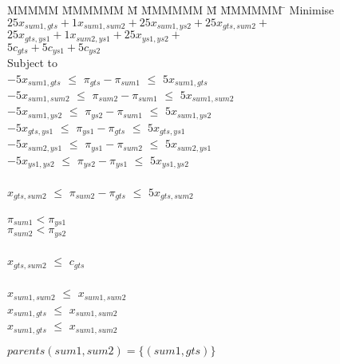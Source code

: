 \begin{tabbing}
MMMMM   \= MMMMMM \= M \= MMMMMM \= M \= MMMMMM \= \kill
Minimise   \> $25 x_{sum1, gts} + 1 x_{sum1,sum2} + 25 x_{sum1, ys2} + 25 x_{gts, sum2} +$ \\
           \> $25 x_{gts, ys1} + 1 x_{sum2, ys1} + 25 x_{ys1, ys2} + $ \\
           \> $ 5 c_{gts} + 5 c_{ys1} + 5 c_{ys2} $\\
Subject to \\
    \> $-5 x_{sum1, gts}$  \> $\le$ \> $\pi_{gts} - \pi_{sum1}$  \> $\le$ \> $5 x_{sum1, gts}$  \\
    \> $-5 x_{sum1, sum2}$ \> $\le$ \> $\pi_{sum2} - \pi_{sum1}$ \> $\le$ \> $5 x_{sum1, sum2}$ \\
    \> $-5 x_{sum1, ys2 }$ \> $\le$ \> $\pi_{ys2 } - \pi_{sum1}$ \> $\le$ \> $5 x_{sum1, ys2 }$ \\
    \> $-5 x_{gts,  ys1 }$ \> $\le$ \> $\pi_{ys1 } - \pi_{gts }$ \> $\le$ \> $5 x_{gts, ys1  }$ \\
    \> $-5 x_{sum2, ys1 }$ \> $\le$ \> $\pi_{ys1 } - \pi_{sum2}$ \> $\le$ \> $5 x_{sum2, ys1 }$ \\
    \> $-5 x_{ys1, ys2  }$ \> $\le$ \> $\pi_{ys2 } - \pi_{ys1 }$ \> $\le$ \> $5 x_{ys1, ys2  }$ \\
\\
    \> $   x_{gts, sum2 }$ \> $\le$ \> $\pi_{sum2} - \pi_{gts }$ \> $\le$ \> $5 x_{gts, sum2 }$ \\
\\
    \>                     \>       \> $\pi_{sum1} < \pi_{ys1}$ \\
    \>                     \>       \> $\pi_{sum2} < \pi_{ys2}$ \\
\\
    \> $ x_{gts,sum2} $    \> $\le$ \> $c_{gts}$ \\
\\
    \> $x_{sum1,sum2}$     \> $\le$ \> $x_{sum1, sum2}$ \\
    \> $x_{sum1, gts}$     \> $\le$ \> $x_{sum1, sum2}$ \\
    \> $x_{sum1, gts}$     \> $\le$ \> $x_{sum1, sum2}$ \\
\end{tabbing}
$parents(sum1,sum2)  = \{(sum1, gts)\}$

